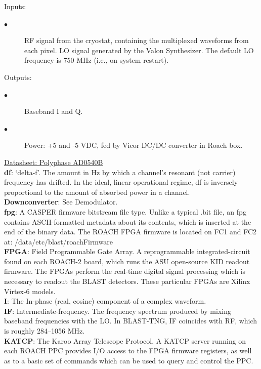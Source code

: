 Inputs:
\begin{description}
  \item[$\bullet$] RF signal from the cryostat, containing the multiplexed waveforms from each pixel. LO signal generated by the Valon Synthesizer. The default LO frequency is 750 MHz (i.e., on system restart).
\end{description}
Outputs:
\begin{description}
  \item[$\bullet$] Baseband I and Q.
  \item[$\bullet$] Power: +5 and -5 VDC, fed by Vicor DC/DC converter in Roach box.
\end{description}
\href{https://polyphasemicrowave.com/media/AD0540B.pdf}{Datasheet: Polyphase AD0540B}\\
\textbf{df}: ‘delta-f’. The amount in Hz by which a channel’s resonant (not carrier) frequency has drifted. In the ideal, linear operational regime, df is inversely proportional to the amount of absorbed power in a channel.\\
\textbf{Downconverter}: See Demodulator. \\
\textbf{fpg}: A CASPER firmware bitstream file type. Unlike a typical .bit file, an fpg contains ASCII-formatted metadata about its contents, which is inserted at the end of the binary data. The ROACH FPGA firmware is located on FC1 and FC2 at: /data/etc/blast/roachFirmware\\
\textbf{FPGA}: Field Programmable Gate Array. A reprogrammable integrated-circuit found on each ROACH-2 board, which runs the ASU open-source KID readout firmware. The FPGAs perform the real-time digital signal processing which is necessary to readout the BLAST detectors. These particular FPGAs are Xilinx Virtex-6 models.\\
\textbf{I}: The In-phase (real, cosine) component of a complex waveform.\\
\textbf{IF}: Intermediate-frequency. The frequency spectrum produced by mixing baseband frequencies with the LO. In BLAST-TNG, IF coincides with RF, which is roughly 284--1056 MHz.\\
\textbf{KATCP}: The Karoo Array Telescope Protocol. A KATCP server running on each ROACH PPC provides I/O access to the FPGA firmware registers, as well as to a basic set of commands which can be used to query and control the PPC.\\
